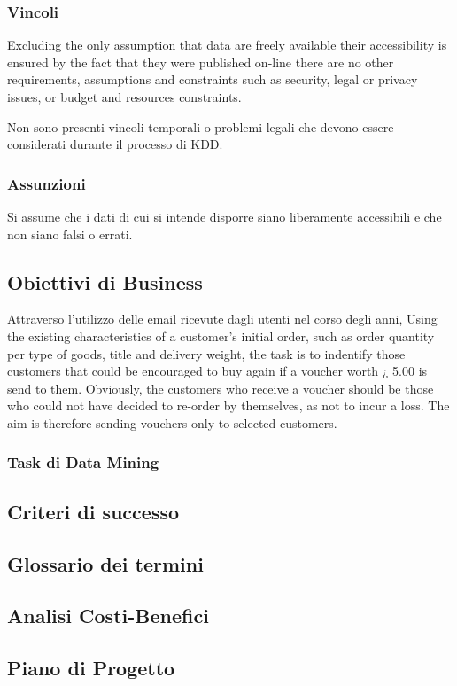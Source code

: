 \subsubsection{Vincoli}
 Excluding the only assumption that data are freely available  their accessibility is ensured by the fact that they were published on-line  there are no other requirements, assumptions and constraints such as security, legal or privacy issues, or budget and resources constraints.

Non sono presenti vincoli temporali o problemi legali che devono essere considerati durante il processo di KDD.

\subsubsection{Assunzioni}

Si assume che i dati di cui si intende disporre siano liberamente accessibili e che non siano falsi o errati.

\subsection{Obiettivi di Business}
Attraverso l'utilizzo delle email ricevute dagli utenti nel corso degli anni, 
Using the existing characteristics of a customer's initial order, such as order quantity per type
of goods, title and delivery weight, the task is to indentify those customers that could be
encouraged to buy again if a voucher worth ¿ 5.00 is send to them. Obviously, the customers
who receive a voucher should be those who could not have decided to re-order by themselves,
as not to incur a loss. The aim is therefore sending vouchers only to selected customers.

\subsubsection{Task di Data Mining}

\subsection{Criteri di successo}

\subsection{Glossario dei termini}

\subsection{Analisi Costi-Benefici}

\subsection{Piano di Progetto}